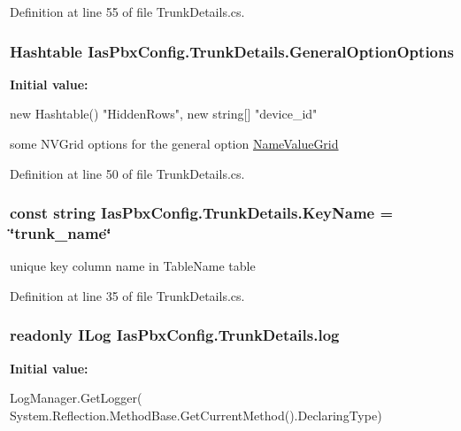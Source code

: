 Definition at line 55 of file TrunkDetails.cs.\hypertarget{class_ias_pbx_config_1_1_trunk_details_a626346e22ccfb014143c37c2dde77fd3}{
\subsubsection[{GeneralOptionOptions}]{\setlength{\rightskip}{0pt plus 5cm}Hashtable {\bf IasPbxConfig.TrunkDetails.GeneralOptionOptions}}}
\label{class_ias_pbx_config_1_1_trunk_details_a626346e22ccfb014143c37c2dde77fd3}
{\bfseries Initial value:}
\begin{DoxyCode}
 new Hashtable()
        {
            {"HiddenRows", new string[] {"device_id"}}
        }
\end{DoxyCode}


some NVGrid options for the general option \hyperlink{class_ias_pbx_config_1_1_name_value_grid}{NameValueGrid} 

Definition at line 50 of file TrunkDetails.cs.\hypertarget{class_ias_pbx_config_1_1_trunk_details_a33a6ccc4c818a4c5c3dfffd05ea0fbf4}{
\subsubsection[{KeyName}]{\setlength{\rightskip}{0pt plus 5cm}const string {\bf IasPbxConfig.TrunkDetails.KeyName} = \char`\"{}trunk\_\-name\char`\"{}}}
\label{class_ias_pbx_config_1_1_trunk_details_a33a6ccc4c818a4c5c3dfffd05ea0fbf4}


unique key column name in TableName table 

Definition at line 35 of file TrunkDetails.cs.\hypertarget{class_ias_pbx_config_1_1_trunk_details_ae08deb88359e29b30255750ee33072a3}{
\subsubsection[{log}]{\setlength{\rightskip}{0pt plus 5cm}readonly ILog {\bf IasPbxConfig.TrunkDetails.log}}}
\label{class_ias_pbx_config_1_1_trunk_details_ae08deb88359e29b30255750ee33072a3}
{\bfseries Initial value:}
\begin{DoxyCode}
 LogManager.GetLogger(
            System.Reflection.MethodBase.GetCurrentMethod().DeclaringType)
\end{DoxyCode}


